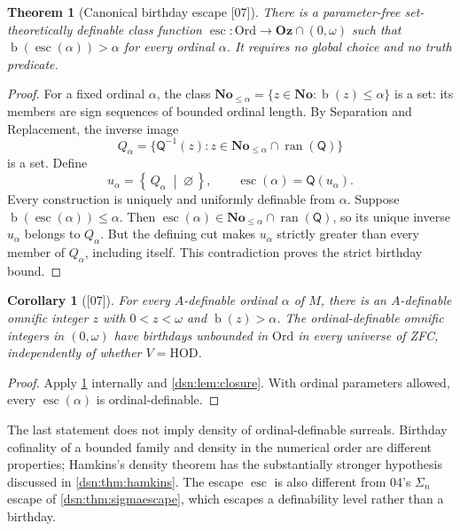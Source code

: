\documentclass[11pt,a4paper]{article}
\numberwithin{equation}{section}
\newtheorem{theorem}{Theorem}[section]
\newtheorem{corollary}[corollary]{Corollary}
\theoremstyle{definition}
\theoremstyle{remark}
\newcommand{\No}{\mathbf{No}}
\newcommand{\Oz}{\mathbf{Oz}}
\newcommand{\Ord}{\mathrm{Ord}}
\newcommand{\HOD}{\mathrm{HOD}}
\newcommand{\bd}{\operatorname{b}}
\newcommand{\ran}{\operatorname{ran}}
\newcommand{\Mc}{\mathsf Q}
\newcommand{\esc}{\operatorname{esc}}
\newcommand{\cut}[2]{\left\{\,#1\;\middle|\;#2\,\right\}}
\newcommand{\src}[1]{\textup{\textsf{\small[#1]}}}
\begin{document}
\begin{theorem}[Canonical birthday escape \src{07}]\label{dsn:thm:bdescape}
There is a parameter-free set-theoretically definable class function
$\esc:\Ord\to\Oz\cap(0,\omega)$ such that $\bd(\esc(\alpha))>\alpha$ for
every ordinal $\alpha$. It requires no global choice and no truth
predicate.
\end{theorem}
\begin{proof}
For a fixed ordinal $\alpha$, the class $\No_{\le\alpha}=\{z\in\No:
\bd(z)\le\alpha\}$ is a set: its members are sign sequences of bounded
ordinal length. By Separation and Replacement, the inverse image
\[
 Q_\alpha=\{\Mc^{-1}(z):z\in\No_{\le\alpha}\cap\ran(\Mc)\}
\]
is a set. Define
\begin{equation}\label{dsn:eq:bdescape}
 u_\alpha=\cut{Q_\alpha}{\varnothing},\qquad
 \esc(\alpha)=\Mc(u_\alpha).
\end{equation}
Every construction is uniquely and uniformly definable from $\alpha$.
Suppose $\bd(\esc(\alpha))\le\alpha$. Then $\esc(\alpha)\in
\No_{\le\alpha}\cap\ran(\Mc)$, so its unique inverse $u_\alpha$ belongs to
$Q_\alpha$. But the defining cut makes $u_\alpha$ strictly greater than
every member of $Q_\alpha$, including itself. This contradiction proves the
strict birthday bound.
\end{proof}

\begin{corollary}[\src{07}]\label{dsn:cor:escape-def}
For every $A$-definable ordinal $\alpha$ of $M$, there is an $A$-definable
omnific integer $z$ with $0<z<\omega$ and $\bd(z)>\alpha$. The
ordinal-definable omnific integers in $(0,\omega)$ have birthdays unbounded
in $\Ord$ in every universe of ZFC, independently of whether $V=\HOD$.
\end{corollary}
\begin{proof}
Apply \cref{dsn:thm:bdescape} internally and \cref{dsn:lem:closure}. With
ordinal parameters allowed, every $\esc(\alpha)$ is ordinal-definable.
\end{proof}

The last statement does not imply density of ordinal-definable surreals.
Birthday cofinality of a bounded family and density in the numerical order
are different properties; Hamkins's density theorem has the substantially
stronger hypothesis discussed in \cref{dsn:thm:hamkins}. The escape
$\esc$ is also different from 04's $\Sigma_n$ escape of
\cref{dsn:thm:sigmaescape}, which escapes a definability level rather than
a birthday.
\end{document}

